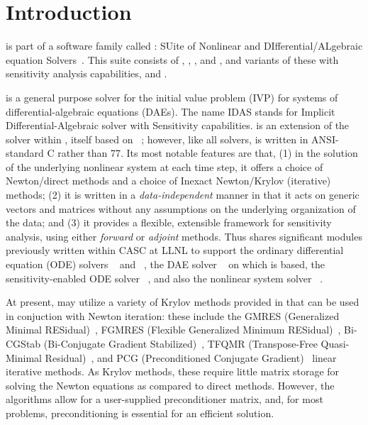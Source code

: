 \chapter{Introduction}\label{s:intro}

{\idas} is part of a software family called {\sundials}:
SUite of Nonlinear and DIfferential/ALgebraic equation Solvers~\cite{HBGLSSW:05}.
This suite consists of {\cvode}, {\arkode}, {\kinsol}, and {\ida}, and variants
of these with sensitivity analysis capabilities, {\cvodes} and {\idas}.

{\idas} is a general purpose solver for the initial value problem (IVP) for
systems of differential-algebraic equations (DAEs).  The name IDAS
stands for Implicit Differential-Algebraic solver with Sensitivity capabilities.
{\idas} is an extension of the {\ida} solver within {\sundials}, itself
based on {\daspk}~\cite{BHP:94,BHP:98}; however, like all {\sundials} solvers,
{\idas} is written in ANSI-standard C rather than {\F}77.
Its most notable features are that,
(1) in the solution of the underlying nonlinear system at each time
step, it offers a choice of Newton/direct methods and a choice of
Inexact Newton/Krylov (iterative) methods;
(2) it is written in a {\em data-independent} manner in that it acts
on generic vectors and matrices without any assumptions on the
underlying organization of the data; and
(3) it provides a flexible, extensible framework for sensitivity analysis,
using either {\em forward} or {\em adjoint} methods.
Thus {\idas} shares significant modules previously written within CASC
at LLNL to support the ordinary differential equation (ODE) solvers
{\cvode}~\cite{cvode_ug,CoHi:96} and {\pvode}~\cite{ByHi:98,ByHi:99},
the DAE solver {\ida}~\cite{ida_ug} on which {\idas} is based, the
sensitivity-enabled ODE solver {\cvodes}~\cite{cvodes_ug,SeHi:05}, and
also the nonlinear system solver {\kinsol}~\cite{kinsol_ug}.

At present, {\idas} may utilize a variety of Krylov methods provided
in {\sundials} that can be used in conjuction with Newton iteration:
these include the GMRES (Generalized Minimal RESidual)~\cite{SaSc:86},
FGMRES (Flexible Generalized Minimum RESidual)~\cite{Saa:93},
Bi-CGStab (Bi-Conjugate Gradient Stabilized)~\cite{Van:92}, TFQMR
(Transpose-Free Quasi-Minimal Residual)~\cite{Fre:93}, and PCG
(Preconditioned Conjugate Gradient)~\cite{HeSt:52} linear iterative
methods.  As Krylov methods, these require little
matrix storage for solving the Newton equations as compared to direct
methods. However, the algorithms allow for a user-supplied preconditioner
matrix, and, for most problems, preconditioning is essential for an
efficient solution.

